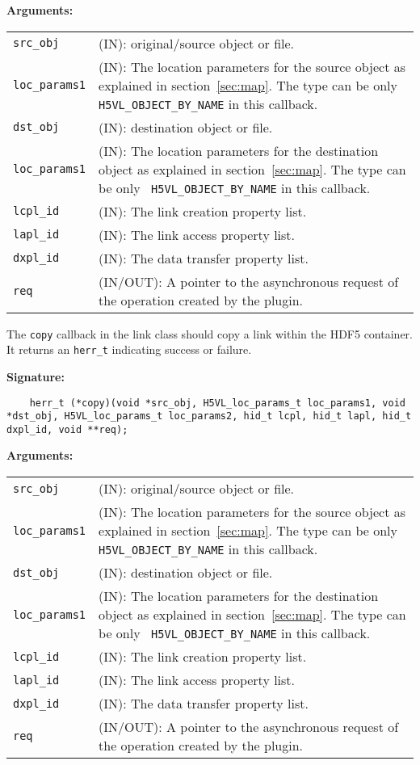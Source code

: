 \textbf{Arguments:}\\
\begin{tabular}{l p{10cm}}
  {\tt src\_obj} & (IN): original/source object or file. \\
  {\tt loc\_params1} & (IN): The location parameters for the source
  object as explained in section~\ref{sec:map}. The type can be only {\tt
    H5VL\_OBJECT\_BY\_NAME} in this callback. \\
  {\tt dst\_obj} & (IN): destination object or file. \\
  {\tt loc\_params1} & (IN): The location parameters for the destination
  object as explained in section~\ref{sec:map}. The type can be only {\tt
    H5VL\_OBJECT\_BY\_NAME} in this callback. \\
  {\tt lcpl\_id} & (IN): The link creation property list.\\
  {\tt lapl\_id} & (IN): The link access property list.\\
  {\tt dxpl\_id} & (IN): The data transfer property list.\\
  {\tt req} & (IN/OUT): A pointer to the asynchronous request of the
  operation created by the plugin.\\
\end{tabular}

The {\tt copy} callback in the link class should copy a link within the HDF5 container. It returns an {\tt herr\_t} indicating success or failure.

\textbf{Signature:}
\begin{lstlisting}
    herr_t (*copy)(void *src_obj, H5VL_loc_params_t loc_params1, void *dst_obj, H5VL_loc_params_t loc_params2, hid_t lcpl, hid_t lapl, hid_t dxpl_id, void **req);
\end{lstlisting}

\textbf{Arguments:}\\
\begin{tabular}{l p{10cm}}
  {\tt src\_obj} & (IN): original/source object or file. \\
  {\tt loc\_params1} & (IN): The location parameters for the source
  object as explained in section~\ref{sec:map}. The type can be only {\tt
    H5VL\_OBJECT\_BY\_NAME} in this callback. \\
  {\tt dst\_obj} & (IN): destination object or file. \\
  {\tt loc\_params1} & (IN): The location parameters for the destination
  object as explained in section~\ref{sec:map}. The type can be only {\tt
    H5VL\_OBJECT\_BY\_NAME} in this callback. \\
  {\tt lcpl\_id} & (IN): The link creation property list.\\
  {\tt lapl\_id} & (IN): The link access property list.\\
  {\tt dxpl\_id} & (IN): The data transfer property list.\\
  {\tt req} & (IN/OUT): A pointer to the asynchronous request of the
  operation created by the plugin.\\
\end{tabular}


